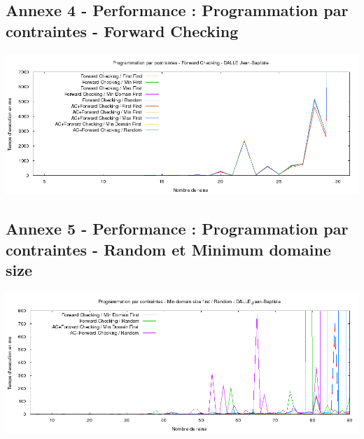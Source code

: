 \documentclass[a4paper,10pt]{article}
\begin{document}
\subsection{Annexe 4 - Performance : Programmation par contraintes - Forward Checking}
\includegraphics[width=1\textwidth]{Programmation_par_contraintes_-_Forward_Checking.png}

\subsection{Annexe 5 - Performance : Programmation par contraintes - Random et Minimum domaine size}
\includegraphics[width=1\textwidth]{Programmation_par_contraintes_-_Random_Min_Domain_Size.png}
\end{document}
